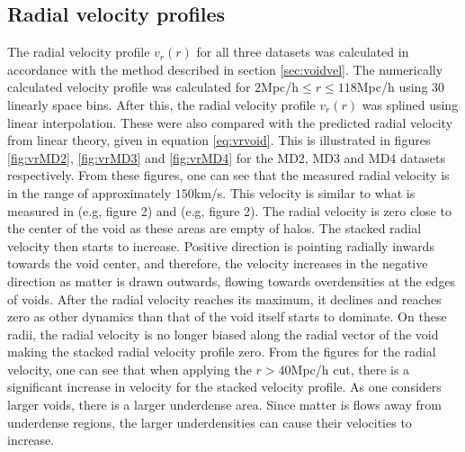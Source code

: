 \subsection{Radial velocity profiles}
The radial velocity profile $v_r(r)$ for all three datasets was calculated in accordance with the method described in section \ref{sec:voidvel}. The numerically calculated velocity profile was calculated for $2$Mpc/h$\leq r\leq 118$Mpc/h using $30$ linearly space bins. After this, the radial velocity profile $v_r(r)$ was splined using linear interpolation. These were also compared with the predicted radial velocity from linear theory, given in equation \ref{eq:vrvoid}. This is illustrated in figures \ref{fig:vrMD2}, \ref{fig:vrMD3} and \ref{fig:vrMD4} for the MD2, MD3 and MD4 datasets respectively. From these figures, one can see that the measured radial velocity is in the range of approximately $150$km/s. This velocity is similar to what is measured in \cite{Nadathur_2018} (e.g, figure 2) and \cite{Achitouv_streaming} (e.g, figure 2). The radial velocity is zero close to the center of the void as these areas are empty of halos. The stacked radial velocity then starts to increase. Positive direction is pointing radially inwards towards the void center, and therefore, the velocity increases in the negative direction as matter is drawn outwards, flowing towards overdensities at the edges of voids. After the radial velocity reaches its maximum, it declines and reaches zero as other dynamics than that of the void itself starts to dominate. On these radii, the radial velocity is no longer biased along the radial vector of the void making the stacked radial velocity profile zero. From the figures for the radial velocity, one can see that when applying the $r>40$Mpc/h cut, there is a significant increase in velocity for the stacked velocity profile. As one considers larger voids, there is a larger underdense area. Since matter is flows away from underdense regions, the larger underdensities can cause their velocities to increase. \\\indent
